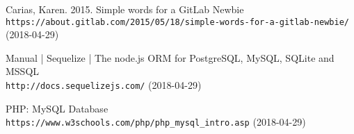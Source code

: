 \begin{thebibliography}{99}

Carias, Karen. 2015. Simple words for a GitLab Newbie
\\\texttt{https://about.gitlab.com/2015/05/18/simple-words-for-a-gitlab-newbie/}
(2018-04-29)

Manual | Sequelize | The node.js ORM for PostgreSQL, MySQL, SQLite and MSSQL \\\texttt{http://docs.sequelizejs.com/}
(2018-04-29)

PHP: MySQL Database \\\texttt{https://www.w3schools.com/php/php_mysql_intro.asp} 
(2018-04-29)

\end{thebibliography}
